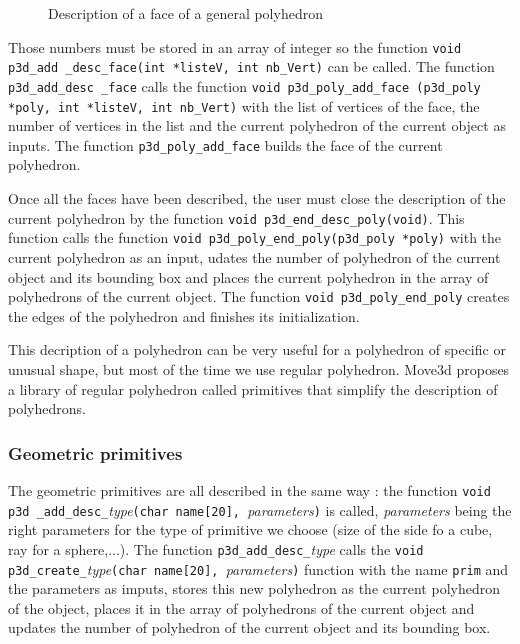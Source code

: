 \begin{figure}[hbt]
\centerline{
}
\caption{\small 
Description of a face of a general polyhedron
}
\label{FIG_FACE}
\end{figure}

Those numbers must be stored in an array of integer so the function {\tt void
p3d\_add \_desc\_face(int *listeV, int nb\_Vert)}
can be called. The function {\tt
p3d\_add\_desc \_face} calls the function {\tt void p3d\_poly\_add\_face (p3d\_poly *poly, int *listeV, int nb\_Vert)} 
with the list of vertices of the face, the number of vertices in the
list and the current polyhedron of the current object as inputs. The
function {\tt p3d\_poly\_add\_face} builds the face of the current polyhedron.

Once all the faces have been described, the user must close the description
of the current polyhedron by the function {\tt void
p3d\_end\_desc\_poly(void)}. This
function calls the function {\tt void p3d\_poly\_end\_poly(p3d\_poly
*poly)} 
with the current polyhedron as an input, udates the number of
polyhedron of the current object and its bounding box and places the
current polyhedron in the array of polyhedrons of the current
object. The function {\tt void p3d\_poly\_end\_poly} creates the edges of
the polyhedron and finishes its initialization.

This decription of a polyhedron can be very useful for a polyhedron of
specific or unusual shape, but most of the time we use regular
polyhedron. Move3d proposes a library of regular polyhedron called
primitives that simplify the description of polyhedrons.

\subsubsection{Geometric primitives}

The geometric primitives are all described in the same way : the
function {\tt void p3d \_add\_desc\_}{\it type}{\tt (char name[20],
}{\it parameters}{\tt )}
 is called,
{\it parameters} being the right parameters for the type of primitive
we choose (size of the side fo a cube, ray for a sphere,...).
The function {\tt p3d\_add\_desc\_}{\it type} calls the {\tt void
p3d\_create\_}{\it type}{\tt (char name[20], }{\it parameters}{\tt )}
function with the
name {\tt prim} and the parameters as imputs, stores this new
polyhedron as the current polyhedron of the object, places it in the
array of polyhedrons of the current object and updates the number of
polyhedron of the current object and its bounding box. 

